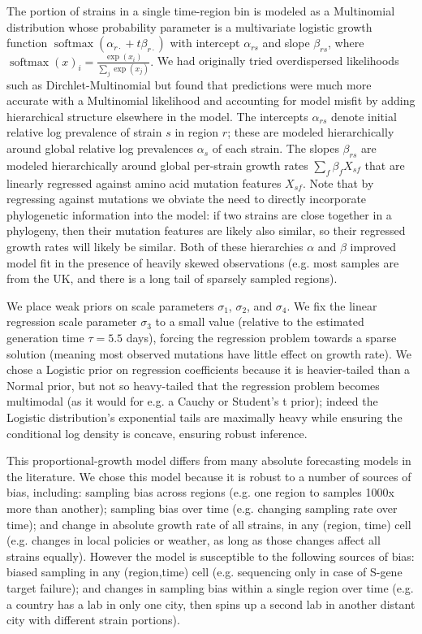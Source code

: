 \documentclass[12pt]{article}
\newcommand \blank {{\,\pmb\cdot\,}}
\begin{document}
The portion of strains in a single time-region bin is modeled as a Multinomial distribution whose probability parameter is a multivariate logistic growth function $\operatorname{softmax}(\alpha_{r\blank} + t\beta_{r\blank})$ with intercept $\alpha_{rs}$ and slope $\beta_{rs}$, where
$
  \operatorname{softmax}(x)_i = \frac {\exp(x_i)} {\sum_j \exp(x_j)}.
$
We had originally tried overdispersed likelihoods such as Dirchlet-Multinomial but found that predictions were much more accurate with a Multinomial likelihood and accounting for model misfit by adding hierarchical structure elsewhere in the model.
The intercepts $\alpha_{rs}$ denote initial relative log prevalence of strain $s$ in region $r$; these are modeled hierarchically around global relative log prevalences $\alpha_s$ of each strain.
The slopes $\beta_{rs}$ are modeled hierarchically around global per-strain growth rates $\sum_f \beta_f X_{sf}$ that are linearly regressed against amino acid mutation features $X_{sf}$.
Note that by regressing against mutations we obviate the need to directly incorporate phylogenetic information into the model: if two strains are close together in a phylogeny, then their mutation features are likely also similar, so their regressed growth rates will likely be similar.
Both of these hierarchies $\alpha$ and $\beta$ improved model fit in the presence of heavily skewed observations (e.g. most samples are from the UK, and there is a long tail of sparsely sampled regions).

We place weak priors on scale parameters $\sigma_1$, $\sigma_2$, and $\sigma_4$.
We fix the linear regression scale parameter $\sigma_3$ to a small value (relative to the estimated generation time $\tau=5.5$ days), forcing the regression problem towards a sparse solution (meaning most observed mutations have little effect on growth rate).
We chose a Logistic prior on regression coefficients because it is heavier-tailed than a Normal prior, but not so heavy-tailed that the regression problem becomes multimodal (as it would for e.g. a Cauchy or Student's t prior); indeed the Logistic distribution's exponential tails are maximally heavy while ensuring the conditional log density is concave, ensuring robust inference.

This proportional-growth model differs from many absolute forecasting models in the literature.
We chose this model because it is robust to a number of sources of bias, including:
sampling bias across regions (e.g. one region to samples 1000x more than another);
sampling bias over time (e.g. changing sampling rate over time); and
change in absolute growth rate of all strains, in any (region, time) cell (e.g. changes in local policies or weather, as long as those changes affect all strains equally).
However the model is susceptible to the following sources of bias:
biased sampling in any (region,time) cell (e.g. sequencing only in case of S-gene target failure); and changes in sampling bias within a single region over time (e.g. a country has a lab in only one city, then spins up a second lab in another distant city with different strain portions).
\end{document}
